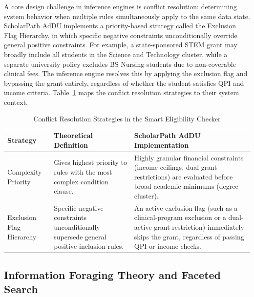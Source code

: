 A core design challenge in inference engines is conflict resolution: determining system behavior when multiple rules simultaneously apply to the same data state. ScholarPath AdDU implements a priority-based strategy called the Exclusion Flag Hierarchy, in which specific negative constraints unconditionally override general positive constraints. For example, a state-sponsored STEM grant may broadly include all students in the Science and Technology cluster, while a separate university policy excludes BS Nursing students due to non-coverable clinical fees. The inference engine resolves this by applying the exclusion flag and bypassing the grant entirely, regardless of whether the student satisfies QPI and income criteria. Table~\ref{tab:conflict} maps the conflict resolution strategies to their system context. \begin{table}[htbp]
  \centering
  \small
  \caption{Conflict Resolution Strategies in the Smart Eligibility Checker}
  \label{tab:conflict}
  \begin{tabular}{@{}p{3.4cm} p{5.2cm} p{5.2cm}@{}}
    \toprule
    Strategy & Theoretical Definition & ScholarPath AdDU Implementation \\
    \midrule
    Complexity Priority & Gives highest priority to rules with the most complex condition clause. & Highly granular financial constraints (income ceilings, dual-grant restrictions) are evaluated before broad academic minimums (degree cluster). \\
    \addlinespace
    Exclusion Flag Hierarchy & Specific negative constraints unconditionally supersede general positive inclusion rules. & An active exclusion flag (such as a clinical-program exclusion or a dual-active-grant restriction) immediately skips the grant, regardless of passing QPI or income checks. \\
    \bottomrule
  \end{tabular}
\end{table}


\subsection{Information Foraging Theory and Faceted Search}

